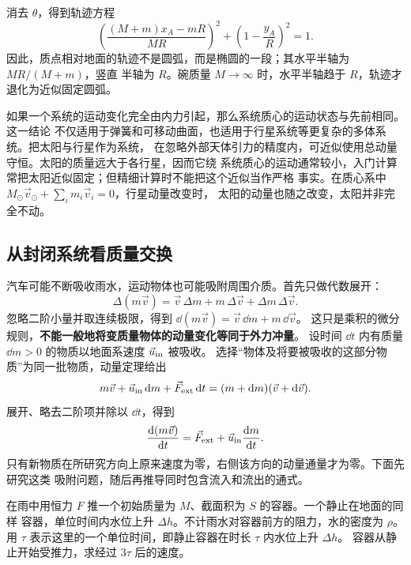 {\begin{xesolution}
\soldiagThreeEighteen
消去 $\theta$，得到轨迹方程
\[
 \boxed{
 \left(\frac{(M+m)x_A-mR}{MR}\right)^2
 +\left(1-\frac{y_A}{R}\right)^2=1}.
\]
因此，质点相对地面的轨迹不是圆弧，而是椭圆的一段；其水平半轴为 $MR/(M+m)$，竖直
半轴为 $R$。碗质量 $M\to\infty$ 时，水平半轴趋于 $R$，轨迹才退化为近似固定圆弧。
\end{xesolution}

如果一个系统的运动变化完全由内力引起，那么系统质心的运动状态与先前相同。这一结论
不仅适用于弹簧和可移动曲面，也适用于行星系统等更复杂的多体系统。把太阳与行星作为系统，
在忽略外部天体引力的精度内，可近似使用总动量守恒。太阳的质量远大于各行星，因而它绕
系统质心的运动通常较小，入门计算常把太阳近似固定；但精细计算时不能把这个近似当作严格
事实。在质心系中 $M_\odot\vec v_\odot+\sum_i m_i\vec v_i=0$，行星动量改变时，
太阳的动量也随之改变，太阳并非完全不动。

\subsection{从封闭系统看质量交换}

汽车可能不断吸收雨水，运动物体也可能吸附周围介质。首先只做代数展开：
\begin{equation}
 \Delta(m\vec v)=\vec v\,\Delta m+m\,\Delta\vec v
 +\Delta m\,\Delta\vec v.
\end{equation}
忽略二阶小量并取连续极限，得到 $\dd(m\vec v)=\vec v\,\dd m+m\,\dd\vec v$。
这只是乘积的微分规则，\textbf{不能一般地将变质量物体的动量变化等同于外力冲量}。
设时间 $\dd t$ 内有质量 $\dd m>0$ 的物质以地面系速度 $\vec u_{\rm in}$ 被吸收。
选择“物体及将要被吸收的这部分物质”为同一批物质，动量定理给出
\[
 m\vec v+\vec u_{\rm in}\dd m+\vec F_{\rm ext}\dd t
 =(m+\dd m)(\vec v+\dd\vec v).
\]
展开、略去二阶项并除以 $\dd t$，得到
\begin{equation}\label{ch07:eq:accretion-balance}
 \frac{\dd(m\vec v)}{\dd t}
 =\vec F_{\rm ext}+\vec u_{\rm in}\frac{\dd m}{\dd t}.
\end{equation}
只有新物质在所研究方向上原来速度为零，右侧该方向的动量通量才为零。下面先研究这类
吸附问题，随后再推导同时包含流入和流出的通式。

\begin{origexamplebox}{}\label{ch07:ex:s08-3-19}
在雨中用恒力 $F$ 推一个初始质量为 $M$、截面积为 $S$ 的容器。一个静止在地面的同样
容器，单位时间内水位上升 $\Delta h$。不计雨水对容器前方的阻力，水的密度为 $\rho$。
用 $\tau$ 表示这里的一个单位时间，即静止容器在时长 $\tau$ 内水位上升 $\Delta h$。
容器从静止开始受推力，求经过 $3\tau$ 后的速度。


\end{origexamplebox}}
